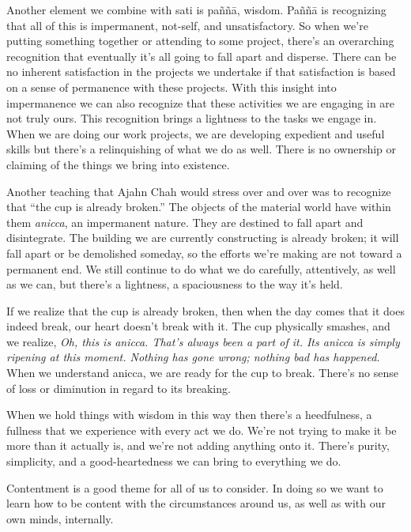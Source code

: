 Another element we combine with sati is paññā, wisdom. Paññā is 
recognizing that all of this is impermanent, not-self, and 
unsatisfactory. So when we're putting something together or attending 
to some project, there's an overarching recognition that eventually 
it's all going to fall apart and disperse. There can be no inherent 
satisfaction in the projects we undertake if that satisfaction is based 
on a sense of permanence with these projects. With this insight into 
impermanence we can also recognize that these activities we are 
engaging in are not truly ours. This recognition brings a lightness to 
the tasks we engage in. When we are doing our work projects, we are 
developing expedient and useful skills but there's a relinquishing of 
what we do as well. There is no ownership or claiming of the things we 
bring into existence.

Another teaching that Ajahn Chah would stress over and over was to 
recognize that ``the cup is already broken.'' The objects of the 
material world have within them \emph{anicca}, an impermanent nature. 
They are destined to fall apart and disintegrate. The building we are 
currently constructing is already broken; it will fall apart or be 
demolished someday, so the efforts we're making are not toward a 
permanent end. We still continue to do what we do carefully, 
attentively, as well as we can, but there's a lightness, a spaciousness 
to the way it's held.

If we realize that the cup is already broken, then when the day comes 
that it does indeed break, our heart doesn't break with it. The cup 
physically smashes, and we realize, \emph{Oh, this is anicca. That's 
always been a part of it. Its anicca is simply ripening at this moment. 
Nothing has gone wrong; nothing bad has happened.} When we understand 
anicca, we are ready for the cup to break. There's no sense of loss or 
diminution in regard to its breaking.

When we hold things with wisdom in this way then there's a heedfulness, 
a fullness that we experience with every act we do. We're not trying to 
make it be more than it actually is, and we're not adding anything onto 
it. There's purity, simplicity, and a good-heartedness we can bring to 
everything we do.


Contentment is a good theme for all of us to consider. In doing so we 
want to learn how to be content with the circumstances around us, as 
well as with our own minds, internally.

